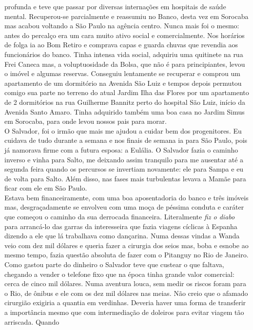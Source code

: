 \documentclass[12pt,brazil,]{book}
\begin{document}
profunda e teve que passar por diversas internações em hospitais de
saúde mental. Recuperou-se parcialmente e reassumiu no Banco, desta vez
em Sorocaba mas acabou voltando a São Paulo na agência centro. Nunca
mais foi o mesmo: antes do percalço era um cara muito ativo social e
comercialmente. Nos horários de folga ia ao Bom Retiro e comprava capas
e guarda chuvas que revendia aos funcionários do banco. Tinha intensa
vida social, adquiriu uma quitinete na rua Frei Caneca mas, a
voluptuosidade da Bolsa, que não é para principiantes, levou o imóvel e
algumas reservas. Conseguiu lentamente se recuperar e comprou um
apartamento de um dormitório na Avenida São Luiz e tempos depois
permutou comigo sua parte no terreno do atual Jardim Ilha das Flores por
um apartamento de 2 dormitórios na rua Guilherme Bannitz perto do
hospital São Luiz, início da Avenida Santo Amaro. Tinha adquirido também
uma boa casa no Jardim Simus em Sorocaba, para onde levou nossos pais
para morar.\\
O Salvador, foi o irmão que mais me ajudou a cuidar bem dos
progenitores. Eu cuidava de tudo durante a semana e nos finais de semana
ia para São Paulo, pois já namorava firme com a futura esposa: a
Eulália. O Salvador fazia o caminho inverso e vinha para Salto, me
deixando assim tranquilo para me ausentar até a segunda feira quando os
percursos se invertiam novamente: ele para Sampa e eu de volta para
Salto. Além disso, nas fases mais turbulentas levava a Mamãe para ficar
com ele em São Paulo.\\
Estava bem financeiramente, com uma boa aposentadoria do banco e três
imóveis mas, desgraçadamente se envolveu com uma moça de péssima conduta
e caráter que começou o caminho da sua derrocada financeira.
Literalmente \emph{fiz o diabo} para arrancá-lo das garras da
interesseira que fazia viagens cíclicas à Espanha dizendo a ele que lá
trabalhava como dançarina. Numa dessas vindas a Wanda veio com dez mil
dólares e queria fazer a cirurgia dos seios mas, boba e esnobe ao mesmo
tempo, fazia questão absoluta de fazer com o Pitanguy no Rio de Janeiro.
Como gastou parte do dinheiro o Salvador teve que custear o que faltava,
chegando a vender o telefone fixo que na época tinha grande valor
comercial: cerca de cinco mil dólares. Numa aventura louca, sem medir os
riscos foram para o Rio, de ônibus e ele com os dez mil dólares nas
meias. Não creio que o afamado cirurgião exigiria a quantia em
verdinhas. Deveria haver uma forma de transferir a importância mesmo que
com intermediação de doleiros para evitar viagem tão arriscada. Quando
\end{document}
